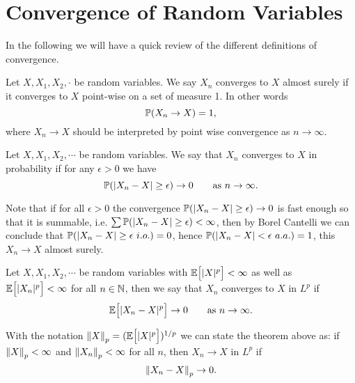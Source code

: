 \section{Convergence of Random Variables}
In the following we will have a quick review of the different definitions of convergence.

\begin{definition}
	Let $ X,X_1,X_2,\cdot $ be random variables. We say $ X_n $ converges to $ X $ almost surely if it converges to $ X $ point-wise on a set of measure 1. In other words
	\[ \mathbb{P}(X_n \to X) = 1, \]
	where $ X_n\to X$ should be interpreted by point wise convergence as $ n\to \infty $.
\end{definition}

\begin{definition}
	Let $ X,X_1,X_2,\cdots $ be random variables. We say that $ X_n $ converges to $ X $ in probability if for any $ \epsilon>0 $ we have
	\[ \mathbb{P}(|X_n - X| \geq \epsilon) \to 0 \qquad \text{as $ n\to \infty $}. \]
\end{definition}
\begin{remark}
	Note that if for all $ \epsilon>0 $ the convergence $ \mathbb{P}(|X_n - X|\geq\epsilon) \to 0 $ is fast enough so that it is summable, i.e. $ \sum\mathbb{P}(|X_n-X|\geq\epsilon)<\infty $, then by Borel Cantelli we can conclude that $ \mathbb{P}(|X_n-X|\geq\epsilon\ i.o.) = 0 $, hence $ \mathbb{P}(|X_n-X|<\epsilon\ a.a.) = 1 $, this $ X_n\to X $ almost surely.
\end{remark}

\begin{definition}[Convergence in $ L^p $]
	Let $ X,X_1,X_2,\cdots $ be random variables with $ \mathbb{E}\big[|X|^p\big] < \infty$ as well as $ \mathbb{E}\big[|X_n|^p\big] < \infty $ for all $ n \in \mathbb{N} $, then we say that $ X_n $ converges to $ X $ in $ L^p $ if 
	\[ \mathbb{E}\big[|X_n - X|^p\big] \to 0\qquad \text{as $ n\to\infty $}. \]
\end{definition}
\begin{remark}
	With the notation $ \norm{X}_p = (\mathbb{E}\big[|X|^p\big])^{1/p} $ we can state the theorem above as: if $ \norm{X}_p < \infty $ and $ \norm{X_n}_p <\infty $ for all $ n $, then $ X_n \to X $ in $ L^p $ if 
	\[ \norm{X_n - X}_p \to 0. \]
\end{remark}

